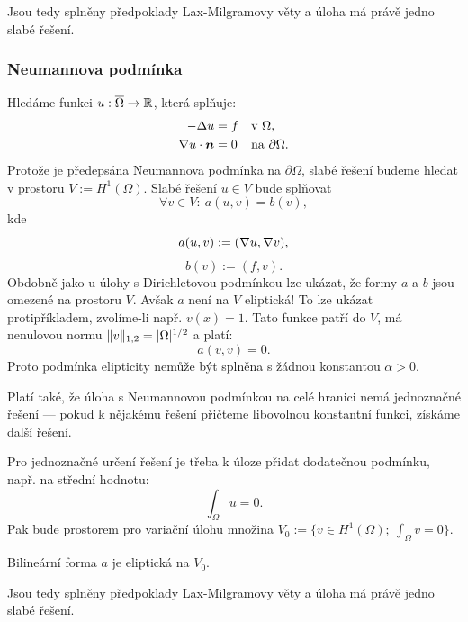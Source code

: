 Jsou tedy splněny předpoklady Lax-Milgramovy věty a úloha má právě jedno slabé řešení.



\subsubsection{Neumannova podmínka}

Hledáme funkci $u:\overline\Omega\rightarrow\mathbb R$, která splňuje:
\[ 
\begin{aligned}
    -\Delta u &= f &&\text{v }\Omega,\\
    \nabla u\cdot\mathbf{\boldsymbol{n}}&=0 && \text{na }\partial\Omega.
\end{aligned} 
\]
Protože je předepsána Neumannova podmínka na $\partial\Omega$, slabé řešení budeme hledat v prostoru $V:=H^1(\Omega)$.
Slabé řešení $u\in V$ bude splňovat
\[ 
    \forall v\in V:\ a(u,v)=b(v),
\]
kde
\begin{equation}\label{eq:def_a_neu}
    a(u,v) := (\nabla u, \nabla v),
\end{equation}
\begin{equation}\label{eq:def_l_neu}
    b(v) := (f,v).
\end{equation}
Obdobně jako u úlohy s Dirichletovou podmínkou lze ukázat, že formy $a$ a $b$ jsou omezené na prostoru $V$.
Avšak $a$ není na $V$ eliptická! To lze ukázat protipříkladem, zvolíme-li např. $v(x)=1$.
Tato funkce patří do $V$, má nenulovou normu $\|v\|_{1,2} = |\Omega|^{1/2}$ a platí:
\[ a(v,v) = 0. \]
Proto podmínka elipticity nemůže být splněna s žádnou konstantou $\alpha>0$.

Platí také, že úloha s Neumannovou podmínkou na celé hranici nemá jednoznačné řešení --- pokud k nějakému řešení přičteme libovolnou konstantní funkci, získáme další řešení.

Pro jednoznačné určení řešení je třeba k úloze přidat dodatečnou podmínku, např. na střední hodnotu:
\[ \int_\Omega u = 0. \]
Pak bude prostorem pro variační úlohu množina $V_0:=\{v\in H^1(\Omega);~\int_\Omega v=0\}$.

\begin{veta}
    Bilineární forma $a$ je eliptická na $V_0$.
\end{veta}
Jsou tedy splněny předpoklady Lax-Milgramovy věty a úloha má právě jedno slabé řešení.





